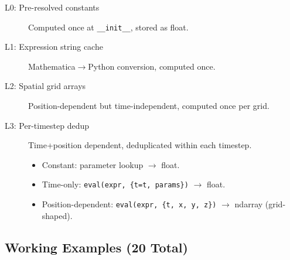 \begin{description}
  \item[L0: Pre-resolved constants] Computed once at \texttt{\_\_init\_\_}, stored as float.
  \item[L1: Expression string cache] Mathematica$\to$Python conversion, computed once.
  \item[L2: Spatial grid arrays] Position-dependent but time-independent, computed once per grid.
  \item[L3: Per-timestep dedup] Time+position dependent, deduplicated within each timestep.
  \begin{itemize}
    \item Constant: parameter lookup $\to$ float.
    \item Time-only: \texttt{eval(expr, \{t=t, params\})} $\to$ float.
    \item Position-dependent: \texttt{eval(expr, \{t, x, y, z\})} $\to$ ndarray (grid-shaped).
  \end{itemize}
\end{description}

\subsection{Working Examples (20 Total)}
\label{sec:working-examples}

